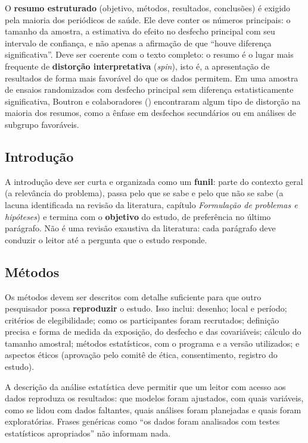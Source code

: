 \documentclass[
]{book}
\begin{document}
O \textbf{resumo estruturado} (objetivo, métodos, resultados, conclusões) é exigido pela maioria dos periódicos de saúde. Ele deve conter os números principais: o tamanho da amostra, a estimativa do efeito no desfecho principal com seu intervalo de confiança, e não apenas a afirmação de que ``houve diferença significativa''. Deve ser coerente com o texto completo: o resumo é o lugar mais frequente de \textbf{distorção interpretativa} (\emph{spin}), isto é, a apresentação de resultados de forma mais favorável do que os dados permitem. Em uma amostra de ensaios randomizados com desfecho principal sem diferença estatisticamente significativa, Boutron e colaboradores () encontraram algum tipo de distorção na maioria dos resumos, como a ênfase em desfechos secundários ou em análises de subgrupo favoráveis.

\subsection{Introdução}\label{introduuxe7uxe3o}

A introdução deve ser curta e organizada como um \textbf{funil}: parte do contexto geral (a relevância do problema), passa pelo que se sabe e pelo que não se sabe (a lacuna identificada na revisão da literatura, capítulo \emph{Formulação de problemas e hipóteses}) e termina com o \textbf{objetivo} do estudo, de preferência no último parágrafo. Não é uma revisão exaustiva da literatura: cada parágrafo deve conduzir o leitor até a pergunta que o estudo responde.

\subsection{Métodos}\label{muxe9todos}

Os métodos devem ser descritos com detalhe suficiente para que outro pesquisador possa \textbf{reproduzir} o estudo. Isso inclui: desenho; local e período; critérios de elegibilidade; como os participantes foram recrutados; definição precisa e forma de medida da exposição, do desfecho e das covariáveis; cálculo do tamanho amostral; métodos estatísticos, com o programa e a versão utilizados; e aspectos éticos (aprovação pelo comitê de ética, consentimento, registro do estudo).

A descrição da análise estatística deve permitir que um leitor com acesso aos dados reproduza os resultados: que modelos foram ajustados, com quais variáveis, como se lidou com dados faltantes, quais análises foram planejadas e quais foram exploratórias. Frases genéricas como ``os dados foram analisados com testes estatísticos apropriados'' não informam nada.
\end{document}
